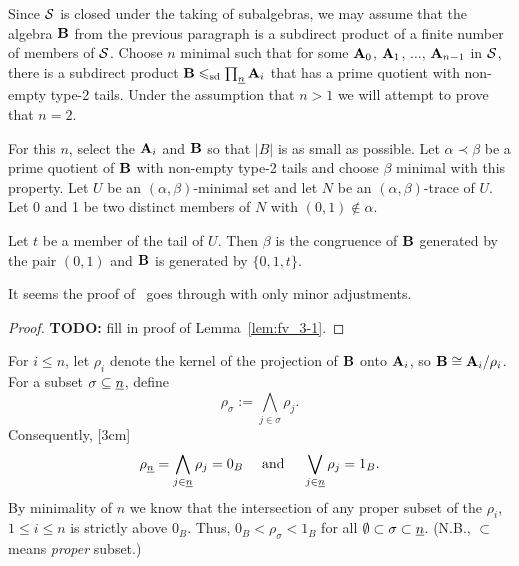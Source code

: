 Since $\mathcal{S}$ is closed under the taking of subalgebras,
we may assume that the algebra $\mathbf{B}$ from the previous paragraph is a subdirect
product of a finite number of members of $\mathcal{S}$. Choose $n$ minimal such that for
some $\mathbf{A}_0$, $\mathbf{A}_1$, $\dots$, $\mathbf{A}_{n-1}$ in $\mathcal{S}$, there is a subdirect
product $\mathbf{B} \leqslant_{\mathrm{sd}} \prod_{\underline{n}} \mathbf{A}_i$
that has a prime quotient with non-empty type-2 tails.
Under the assumption that $n > 1$ we will attempt to prove that $n = 2$.

For this $n$, select the $\mathbf{A}_i$ and $\mathbf{B}$ so that $|B|$ is as small as possible.
Let $\alpha \prec \beta$ be a prime quotient of $\mathbf{B}$ with non-empty
type-2 tails and choose $\beta$ minimal with this property.
Let $U$ be an $(\alpha, \beta)$-minimal set and let $N$ be an
 $(\alpha, \beta)$-trace of $U$. Let 0 and 1 be
two distinct members of $N$ with $(0, 1) \notin \alpha$.

\begin{lem}
  \label{lem:fv_3-1}
  Let $t$ be a member of the tail of $U$. Then $\beta$ is the congruence of $\mathbf{B}$
  generated by the pair $(0, 1)$ and $\mathbf{B}$ is generated by $\{0, 1, t\}$.
\end{lem}
It seems the proof of~\cite[Lem.~3.1]{Freese:2009} goes through with only minor
adjustments. %
\begin{proof}
  {\bf TODO:} fill in proof of  Lemma~\ref{lem:fv_3-1}.
\end{proof}



For $i \leq n$, %
let $\rho_i$ denote the kernel of the projection of $\mathbf{B}$ onto $\mathbf{A}_i$,
so $\mathbf{B} \cong \mathbf{A}_i/\rho_i$.
For a subset $\sigma \subseteq \underline{n}$, define
\[
\rho_\sigma := \bigwedge_{j\in \sigma} \rho_j.
\]
Consequently,
[3cm]
\begin{equation}
  \label{eq:2}
 \rho_{\nn} = \bigwedge_{j\in \nn}\rho_j = 0_{B}
 \quad \text{ and } \quad
\bigvee_{j\in \nn}\rho_j =1_B. %
\end{equation}
By minimality of $n$ we know that the intersection of any  proper subset of the
$\rho_i$, $1 \leq i \leq n$ is strictly above $0_B$.  Thus,
$0_B < \rho_\sigma < 1_B$ for all 
$\emptyset \subset \sigma\subset \underline{n}$.
(N.B.,  $\subset$ means \emph{proper} subset.)


